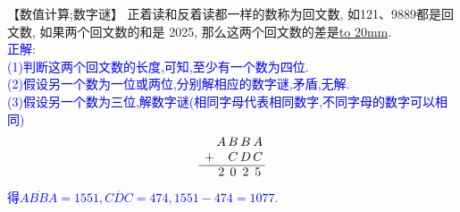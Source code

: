 \item {
    【数值计算;数字谜】
    正着读和反着读都一样的数称为回文数, 如121、9889都是回文数, 如果两个回文数的和是 2025, 那么这两个回文数的差是\underline{\hbox to 20mm{}}.
    \ifshowSolution
        \\\fangsong{}\textcolor{blue}{
            正解: \\
            (1)判断这两个回文数的长度,可知,至少有一个数为四位.\\
            (2)假设另一个数为一位或两位,分别解相应的数字谜,矛盾,无解.\\
            (3)假设另一个数为三位,解数字谜(相同字母代表相同数字,不同字母的数字可以相同)
            \[
            \begin{array}{l@{\,} c@{\,} c@{\,} c@{\,} c@{\,}}
            & A & B & B & A \\
            + && C  & D & C \\
            \cline{1-5}
            & 2 & 0 & 2 & 5 \\
            \end{array}
            \]
            得$\overline{ABBA}=1551, \overline{CDC}=474, 1551-474=1077.$\\
        }
    \else
        \vspace{1cm}
    \fi
}

